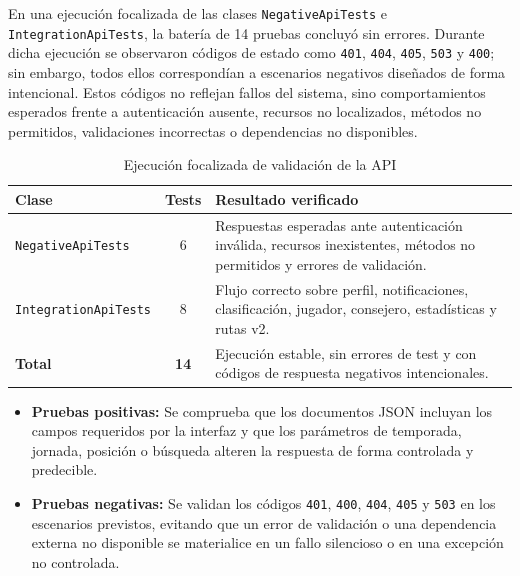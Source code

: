 En una ejecución focalizada de las clases \texttt{NegativeApiTests} e \texttt{IntegrationApiTests}, la batería de 14 pruebas concluyó sin errores. Durante dicha ejecución se observaron códigos de estado como \texttt{401}, \texttt{404}, \texttt{405}, \texttt{503} y \texttt{400}; sin embargo, todos ellos correspondían a escenarios negativos diseñados de forma intencional. Estos códigos no reflejan fallos del sistema, sino comportamientos esperados frente a autenticación ausente, recursos no localizados, métodos no permitidos, validaciones incorrectas o dependencias no disponibles.

\begin{table}[H]
\centering
\caption{Ejecución focalizada de validación de la API}
\label{tab:api-validation}
\renewcommand{\arraystretch}{1.3}
\begin{tabular}{lcp{7.5cm}}
\hline
\textbf{Clase} & \textbf{Tests} & \textbf{Resultado verificado} \\
\hline
\texttt{NegativeApiTests}     & 6  & Respuestas esperadas ante autenticación inválida, recursos inexistentes, métodos no permitidos y errores de validación. \\
\texttt{IntegrationApiTests}  & 8  & Flujo correcto sobre perfil, notificaciones, clasificación, jugador, consejero, estadísticas y rutas v2. \\
\hline
\textbf{Total}                & \textbf{14} & Ejecución estable, sin errores de test y con códigos de respuesta negativos intencionales. \\
\hline
\end{tabular}
\end{table}

\begin{itemize}
    \item \textbf{Pruebas positivas:} Se comprueba que los documentos JSON incluyan los campos requeridos por la interfaz y que los parámetros de temporada, jornada, posición o búsqueda alteren la respuesta de forma controlada y predecible.

    \item \textbf{Pruebas negativas:} Se validan los códigos \texttt{401}, \texttt{400}, \texttt{404}, \texttt{405} y \texttt{503} en los escenarios previstos, evitando que un error de validación o una dependencia externa no disponible se materialice en un fallo silencioso o en una excepción no controlada.
\end{itemize}


